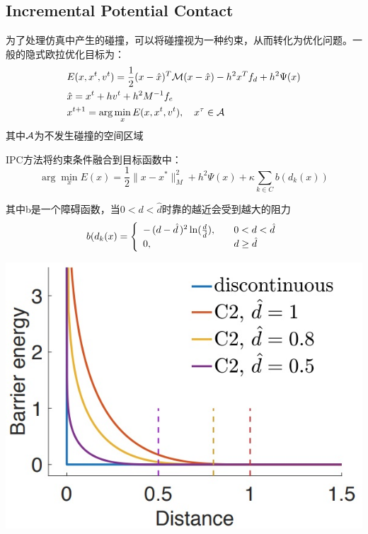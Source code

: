 \documentclass{CLGPY}
\begin{document}
\begin{multicols}{2}
		\section{Incremental Potential Contact\textsuperscript{\cite{8}}}
		为了处理仿真中产生的碰撞，可以将碰撞视为一种约束，从而转化为优化问题。一般的隐式欧拉优化目标为：
       \begin{equation}
		\begin{split}
			&E(x,x^{t},v^{t})=\frac{1}{2}(x-\hat{x})^{T}{\cal M}(x-\hat{x})-h^{2}x^{T}f_{d}+h^{2}\Psi(x)\\
			&\hat{x}=x^{t}+h v^{t}+h^{2}M^{-1}f_{e}\\
			&x^{t+1}=\arg\operatorname*{min}_{x}E(x,x^{t},v^{t}),\quad x^{\tau}\in\cal{A}
		\end{split}
		\end{equation}
		其中$\cal{A}$为不发生碰撞的空间区域

		IPC方法将约束条件融合到目标函数中：
       \begin{equation}
			\arg\operatorname*{min}_{x}E(x)=\frac12\|x-x^{*}\|_{M}^{2}+h^{2}\Psi(x)+\kappa\sum_{k\in C}b(d_{k}(x))
		\end{equation}

		其中b是一个障碍函数，当$0 < d < \hat d$时靠的越近会受到越大的阻力
       \begin{equation}
			b(d_{k}(x)=\left\{\begin{array}{l l}{{-\,(d-\hat{d}\,)^{2}\ln(\frac{d}{\hat{d}}),\quad}}&{{0< d< \hat{d}}}\\ {{0,\quad}}&{{d\geq\hat{d}}}\end{array}\right.
		\end{equation}

        \begin{center}
            \includegraphics[width=1.0\linewidth]{./fig/障碍势能.jpg}
        \end{center}


\end{multicols}
\end{document}
